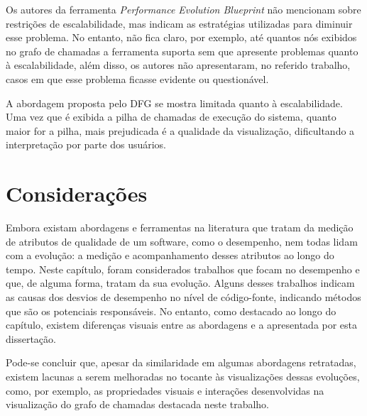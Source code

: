 Os autores da ferramenta \textit{Performance Evolution Blueprint} \cite{SandovalAlcocer2013} não mencionam sobre restrições de escalabilidade, mas indicam as estratégias utilizadas para diminuir esse problema. No entanto, não fica claro, por exemplo, até quantos nós exibidos no grafo de chamadas a ferramenta suporta sem que apresente problemas quanto à escalabilidade, além disso, os autores não apresentaram, no referido trabalho, casos em que esse problema ficasse evidente ou questionável.

A abordagem proposta pelo DFG \cite{Bezemer2015} se mostra limitada quanto à escalabilidade. Uma vez que é exibida a pilha de chamadas de execução do sistema, quanto maior for a pilha, mais prejudicada é a qualidade da visualização, dificultando a interpretação por parte dos usuários.

\section{Considerações} \label{sec:trabalhos-relacionados-consideracoes}

Embora existam abordagens e ferramentas na literatura que tratam da medição de atributos de qualidade de um software, como o desempenho, nem todas lidam com a evolução: a medição e acompanhamento desses atributos ao longo do tempo. Neste capítulo, foram considerados trabalhos que focam no desempenho e que, de alguma forma, tratam da sua evolução. Alguns desses trabalhos indicam as causas dos desvios de desempenho no nível de código-fonte, indicando métodos que são os potenciais responsáveis. No entanto, como destacado ao longo do capítulo, existem diferenças visuais entre as abordagens e a apresentada por esta dissertação.

Pode-se concluir que, apesar da similaridade em algumas abordagens retratadas, existem lacunas a serem melhoradas no tocante às visualizações dessas evoluções, como, por exemplo, as propriedades visuais e interações desenvolvidas na visualização do grafo de chamadas destacada neste trabalho.